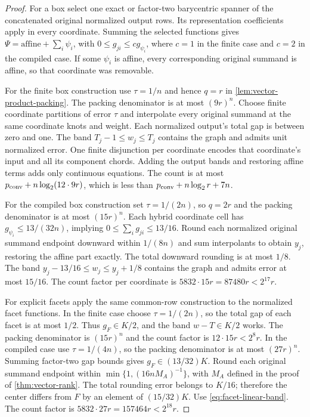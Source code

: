 \begin{proof}
For a box select one exact or factor-two barycentric spanner of the
concatenated original normalized output rows. Its representation
coefficients apply in every coordinate. Summing the selected functions
gives $\Psi=\text{affine}+\sum_i\psi_i$, with
$0\le g_{ji}\le c g_{\psi_i}$, where $c=1$ in the finite case and
$c=2$ in the compiled case. If some $\psi_i$ is affine, every
corresponding original summand is affine, so that coordinate was removable.

For the finite box construction use $\tau=1/n$ and hence $q=r$ in
\cref{lem:vector-product-packing}. The packing denominator is at most
$(9r)^n$. Choose finite coordinate partitions of error $\tau$ and
interpolate every original summand at the same coordinate knots and
weight. Each normalized output's total gap is between zero and one.
The band $T_j-1\le w_j\le T_j$ contains the graph and admits unit
normalized error. One finite disjunction per coordinate encodes that
coordinate's input and all its component chords. Adding the output
bands and restoring affine terms adds only continuous equations.
The count is at most $p_{\mathrm{conv}}+n\log_2(12\cdot9r)$, which is less
than $p_{\mathrm{conv}}+n\log_2r+7n$.

For the compiled box construction set $\tau=1/(2n)$, so $q=2r$
and the packing denominator is at most $(15r)^n$.
Each hybrid coordinate cell has $g_{\psi_i}\le13/(32n)$, implying
$0\le\sum_i g_{ji}\le13/16$. Round each normalized original
summand endpoint downward within $1/(8n)$ and sum interpolants to
obtain $y_j$, restoring the affine part exactly. The total downward
rounding is at most $1/8$. The band
$y_j-13/16\le w_j\le y_j+1/8$ contains the graph and admits error
at most $15/16$. The count factor per coordinate is
$5832\cdot15r=87480r<2^{17}r$.

For explicit facets apply the same common-row construction to the
normalized facet functions. In the finite case choose $\tau=1/(2n)$,
so the total gap of each facet is at most $1/2$. Thus $g_F\in K/2$,
and the band $w-T\in K/2$ works. The packing denominator is
$(15r)^n$ and the count factor is $12\cdot15r<2^8r$.
In the compiled case use $\tau=1/(4n)$, so the packing denominator
is at most $(27r)^n$. Summing factor-two gap bounds gives
$g_F\in(13/32)K$. Round each original summand endpoint within
$\min\{1,(16nM_A)^{-1}\}$, with $M_A$ defined in the proof of
\cref{thm:vector-rank}. The total rounding error belongs to $K/16$;
therefore the center differs from $F$ by an element of $(15/32)K$.
Use \eqref{eq:facet-linear-band}. The count factor is
$5832\cdot27r=157464r<2^{18}r$.


\end{proof}

